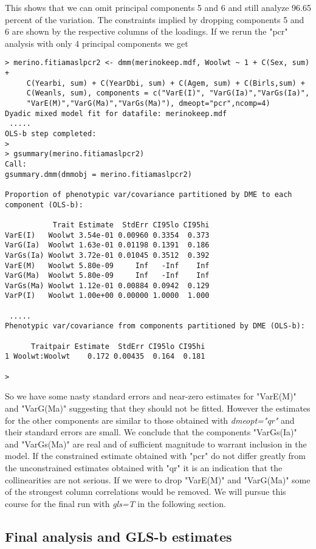 \documentclass[titlepage]{article}  %
\begin{document}
This shows that we can omit principal components 5 and 6 and still analyze 96.65 percent of the variation.  The constraints implied by dropping components 5 and 6 are shown by the respective columns of the loadings. If we rerun the "pcr" analysis with only 4 principal components we get

\begin{verbatim}
> merino.fitiamaslpcr2 <- dmm(merinokeep.mdf, Woolwt ~ 1 + C(Sex, sum) +
     C(Yearbi, sum) + C(YearDbi, sum) + C(Agem, sum) + C(Birls,sum) +
     C(Weanls, sum), components = c("VarE(I)", "VarG(Ia)","VarGs(Ia)",
     "VarE(M)","VarG(Ma)","VarGs(Ma)"), dmeopt="pcr",ncomp=4)
Dyadic mixed model fit for datafile: merinokeep.mdf  
 .....
OLS-b step completed:
>
> gsummary(merino.fitiamaslpcr2)
Call:
gsummary.dmm(dmmobj = merino.fitiamaslpcr2)

Proportion of phenotypic var/covariance partitioned by DME to each component (OLS-b):

           Trait Estimate  StdErr CI95lo CI95hi
VarE(I)   Woolwt 3.54e-01 0.00960 0.3354  0.373
VarG(Ia)  Woolwt 1.63e-01 0.01198 0.1391  0.186
VarGs(Ia) Woolwt 3.72e-01 0.01045 0.3512  0.392
VarE(M)   Woolwt 5.80e-09     Inf   -Inf    Inf
VarG(Ma)  Woolwt 5.80e-09     Inf   -Inf    Inf
VarGs(Ma) Woolwt 1.12e-01 0.00884 0.0942  0.129
VarP(I)   Woolwt 1.00e+00 0.00000 1.0000  1.000

 .....
Phenotypic var/covariance from components partitioned by DME (OLS-b):

      Traitpair Estimate  StdErr CI95lo CI95hi
1 Woolwt:Woolwt    0.172 0.00435  0.164  0.181

> 
\end{verbatim}

So we have some nasty standard errors and near-zero estimates for "VarE(M)" and "VarG(Ma)" suggesting that they should not be fitted. However the estimates for the other components are similar to those obtained with {\em dmeopt="qr"} and their standard errors are small. We conclude that the components "VarGs(Ia)" and "VarGs(Ma)" are real and of sufficient magnitude to warrant inclusion in the model. If the constrained estimate obtained with "pcr" do not differ greatly from the unconstrained estimates obtained with "qr" it is an indication that the collinearities are not serious. If we were to drop "VarE(M)" and "VarG(Ma)" some of the strongest column correlations would be removed. We will pursue this course for the final run with {\em gls=T} in the following section.

\subsection{Final analysis and GLS-b estimates}
\end{document}
